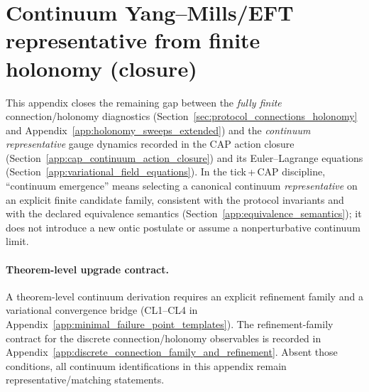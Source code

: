 \section[Continuum Yang--Mills/EFT]{Continuum Yang--Mills/EFT representative from finite holonomy (closure)}
\label{app:continuum_yang_mills_from_holonomy}

This appendix closes the remaining gap between the \emph{fully finite} connection/holonomy diagnostics (Section~\ref{sec:protocol_connections_holonomy} and Appendix~\ref{app:holonomy_sweeps_extended}) and the \emph{continuum representative} gauge dynamics recorded in the CAP action closure (Section~\ref{app:cap_continuum_action_closure}) and its Euler--Lagrange equations (Section~\ref{app:variational_field_equations}).
In the tick\,+\,CAP discipline, ``continuum emergence'' means selecting a canonical continuum \emph{representative} on an explicit finite candidate family, consistent with the protocol invariants and with the declared equivalence semantics (Section~\ref{app:equivalence_semantics}); it does not introduce a new ontic postulate or assume a nonperturbative continuum limit.

\begin{center}
\end{center}

\paragraph{Theorem-level upgrade contract.}
\AuditTag A theorem-level continuum derivation requires an explicit refinement family and a variational convergence bridge (CL1--CL4 in Appendix~\ref{app:minimal_failure_point_templates}).
The refinement-family contract for the discrete connection/holonomy observables is recorded in Appendix~\ref{app:discrete_connection_family_and_refinement}.
Absent those conditions, all continuum identifications in this appendix remain representative/matching statements.

